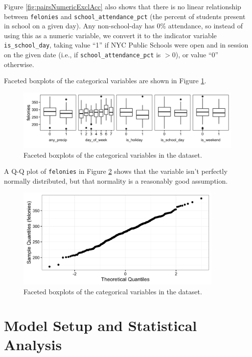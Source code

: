 \documentclass[11pt,notitlepage]{article}
\begin{document}
Figure \ref{fig:pairsNumericExclAcc} also shows that there is no linear relationship between \texttt{felonies} and \texttt{school_attendance_pct} (the percent of students present in school on a given day). Any non-school-day has 0\% attendance, so instead of using this as a numeric variable, we convert it to the indicator variable \texttt{is_school_day}, taking value ``1'' if NYC Public Schools were open and in session on the given date (i.e., if \texttt{school_attendance_pct} is $>0$), or value ``0'' otherwise.

Faceted boxplots of the categorical variables are shown in Figure \ref{fig:facetCategorical}.

\begin{figure}[!h]
	\centering
	\captionsetup{width=0.9\textwidth}
	\includegraphics[width=6in]{figures/facetCategorical.png}
	\caption{Faceted boxplots of the categorical variables in the dataset.}
	\label{fig:facetCategorical}
\end{figure}

A Q-Q plot of \texttt{felonies} in Figure \ref{fig:qqFelonies} shows that the variable isn't perfectly normally distributed, but that normality is a reasonably good assumption.

\begin{figure}[!h]
	\centering
	\captionsetup{width=0.9\textwidth}
	\includegraphics[width=4in]{figures/qqFelonies.png}
	\caption{Faceted boxplots of the categorical variables in the dataset.}
	\label{fig:qqFelonies}
\end{figure}




\section{Model Setup and Statistical Analysis}
\end{document}
